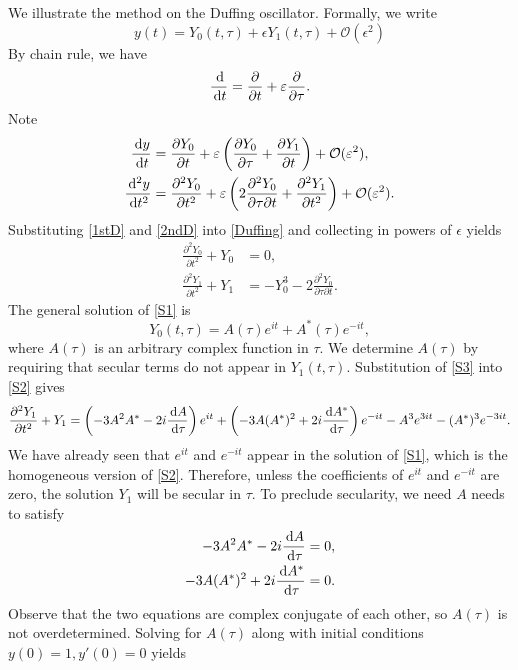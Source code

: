 \documentclass[11pt,reqno,oneside,a4paper]{article}
\begin{document}
We illustrate the method on the Duffing oscillator. Formally, we write
\[ y(t) = Y_0(t, \tau) + \epsilon Y_1(t, \tau) + \mathcal{O}(\epsilon^2) \]
By chain rule, we have
\[ \frac{\,\mathrm{d}}{\,\mathrm{d} t} = \frac{\partial}{\partial t} + \varepsilon \frac{\partial}{\partial \tau}. \]
Note
\begin{align}
\frac{\,\mathrm{d} y}{\,\mathrm{d} t} &= \frac{\partial Y_0}{\partial t} + \varepsilon \left( \frac{\partial Y_0}{\partial \tau} + \frac{\partial Y_1}{\partial t} \right) + \mathcal{O}(\varepsilon^2), \label{1stD} \\
\frac{\,\mathrm{d}^2 y}{\,\mathrm{d} t^2} &=\frac{\partial^2 Y_0}{\partial t^2} + \varepsilon \left( 2 \frac{\partial^2 Y_0}{\partial \tau \partial t} + \frac{\partial^2 Y_1}{\partial t^2} \right) + \mathcal{O}(\varepsilon^2). \label{2ndD}
\end{align}
Substituting \eqref{1stD} and \eqref{2ndD} into \eqref{Duffing} and collecting in powers of $\epsilon$ yields
\begin{align}
\frac{\partial^2 Y_0}{\partial t^2} + Y_0 &= 0, \label{S1}\\
\frac{\partial^2 Y_1}{\partial t^2} + Y_1 &= - Y_0^3 - 2 \frac{\partial^2 Y_0}{\partial \tau \partial t}. \label{S2}
\end{align}
The general solution of \eqref{S1} is 
\begin{equation}\label{S3}
Y_0(t, \tau) = A(\tau) e^{it} + A^*(\tau) e^{-it},
\end{equation}
where $A(\tau)$ is an arbitrary complex function in $\tau.$ We determine $A(\tau)$ by requiring that secular terms do not appear in $Y_1(t, \tau).$ Substitution of \eqref{S3} into \eqref{S2} gives
\begin{equation}\label{S4}
\frac{\partial^2 Y_1}{\partial t^2} + Y_1 =  \left(-3 A^2 A^* - 2i \frac{\,\mathrm{d} A}{\,\mathrm{d} \tau}\right) e^{it} + \left(-3 A (A^*)^2 + 2i \frac{\,\mathrm{d} A^*}{\,\mathrm{d} \tau}\right) e^{-it}  - A^3 e^{3it}  - (A^*)^3 e^{-3it}.
\end{equation}
We have already seen that $e^{it}$ and $e^{-it}$ appear in the solution of \eqref{S1}, which is the homogeneous version of \eqref{S2}. Therefore, unless the coefficients of $e^{it}$ and $e^{-it}$ are zero, the solution $Y_1$ will be secular in $\tau.$  To preclude secularity, we need $A$ needs to satisfy
\begin{align*}
-3 A^2 A^* - 2i \frac{\,\mathrm{d} A}{\,\mathrm{d} \tau} &= 0, \\
-3 A (A^*)^2 + 2i \frac{\,\mathrm{d} A^*}{\,\mathrm{d} \tau} &= 0.
\end{align*}
Observe that the two equations are complex conjugate of each other, so $A(\tau)$ is not overdetermined. Solving for $A(\tau)$ along with initial conditions $y(0)=1, y'(0)=0$ yields 
\end{document}
